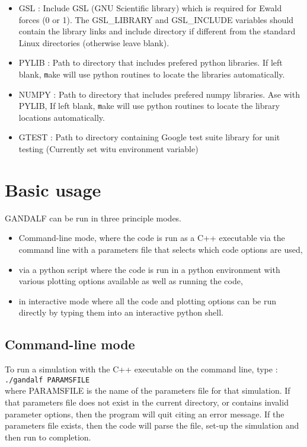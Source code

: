 \documentclass[a4paper]{article}
\newcommand{\var}[1]{\texttt{#1}}
\begin{document}
\begin{itemize}
\item GSL : Include GSL (GNU Scientific library) which is required for Ewald forces (0 or 1). The GSL\_LIBRARY and GSL\_INCLUDE variables should contain the library links and include directory if different from the standard Linux directories (otherwise leave blank).

\item PYLIB : Path to directory that includes prefered python libraries.  If left blank, {\var make} will use python routines to locate the libraries automatically.

\item NUMPY : Path to directory that includes prefered numpy libraries.  Ase with PYLIB, If left blank, {\var make} will use python routines to locate the library locations automatically.

\item GTEST : Path to directory containing Google test suite library for unit testing (Currently set witu environment variable)

\end{itemize}

\newpage


\section{Basic usage}
GANDALF can be run in three principle modes.
\begin{itemize}
\item Command-line mode, where the code is run as a C++ executable via the command line with a parameters file that selects which code options are used,
\item via a python script where the code is run in a python environment with various plotting options available as well as running the code,
\item in interactive mode where all the code and plotting options can be run directly by typing them into an interactive python shell.
\end{itemize}



\subsection{Command-line mode}

\noindent To run a simulation with the C++ executable on the command line, type : \\
\newline
\var{./gandalf PARAMSFILE} \\
\newline
where PARAMSFILE is the name of the parameters file for that simulation.  If that parameters file does not exist in the current directory, or contains invalid parameter options, then the program will quit citing an error message.  If the parameters file exists, then the code will parse the file, set-up the simulation and then run to completion.
\end{document}
